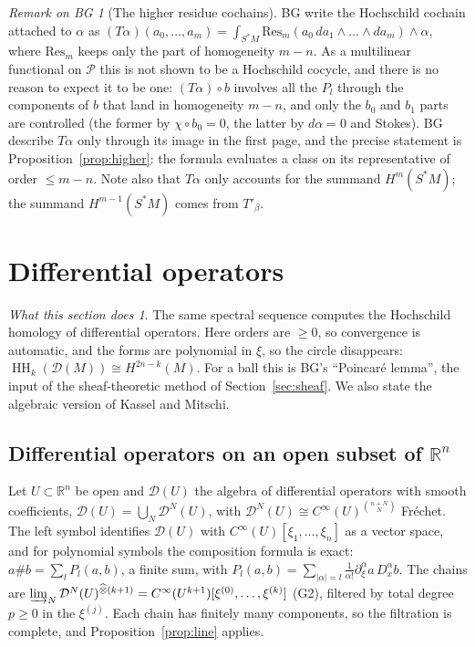 \documentclass[11pt,oneside,reqno]{article}
\DeclareMathOperator{\HH}{HH}
\newcommand{\R}{\mathbb R}
\newcommand{\cD}{\mathcal D}
\newcommand{\cP}{\mathcal P}
\newcommand{\CI}{C^\infty}
\newcommand{\hot}{\mathbin{\widehat\otimes}}
\newcommand{\pa}{\partial}
\theoremstyle{plain}
\theoremstyle{definition}
\theoremstyle{remark}
\newtheorem{bgremark}[theorem]{Remark on BG}
\newtheorem*{whatdoes}{What this section does}
\begin{document}
\begin{bgremark}[The higher residue cochains]\label{rem:higherres}
BG write the Hochschild cochain attached to \(\alpha\) as
\((T\alpha)(a_0,\dots,a_m)=\int_{S^*M}\mathrm{Res}_m(a_0\,da_1\wedge\dots\wedge da_m)\wedge\alpha\), where
\(\mathrm{Res}_m\) keeps only the part of homogeneity \(m-n\). As a multilinear functional on \(\cP\)
this is not shown to be a Hochschild cocycle, and there is no reason to expect it to
be one: \((T\alpha)\circ b\) involves all the \(P_l\) through the components of \(b\) that land in
homogeneity \(m-n\), and only the \(b_0\) and \(b_1\) parts are controlled (the former by \(\chi\circ b_0=0\), the latter by \(d\alpha=0\) and Stokes). BG
describe \(T\alpha\) only through its image in the first page, and the precise
statement is Proposition~\ref{prop:higher}: the formula evaluates a class on its
representative of order \(\le m-n\). Note also that \(T\alpha\) only accounts for the summand
\(H^m(S^*M)\); the summand \(H^{m-1}(S^*M)\) comes from \(T'_\beta\).
\end{bgremark}

\section{Differential operators}\label{sec:diffops}

\begin{whatdoes}
The same spectral sequence computes the Hochschild homology of differential
operators. Here orders are \(\ge0\), so convergence is automatic, and the forms are
polynomial in \(\xi\), so the circle disappears: \(\HH_k(\cD(M))\cong H^{2n-k}(M)\). For a ball this
is BG's ``Poincaré lemma'', the input of the sheaf-theoretic method of
Section~\ref{sec:sheaf}. We also state the algebraic version of Kassel and
Mitschi.
\end{whatdoes}

\subsection{Differential operators on an open subset of \texorpdfstring{\(\R^n\)}{Rn}}\label{subsec:DU}
Let \(U\subset\R^n\) be open and \(\cD(U)\) the algebra of differential operators with smooth
coefficients, \(\cD(U)=\bigcup_N\cD^N(U)\), with \(\cD^N(U)\cong\CI(U)^{\binom{n+N}N}\) Fréchet.
The left symbol identifies \(\cD(U)\) with \(\CI(U)[\xi_1,\dots,\xi_n]\) as a vector space,
and for polynomial symbols the composition formula is exact:
\(a\#b=\sum_lP_l(a,b)\), a finite sum, with \(P_l(a,b)=\sum_{|\alpha|=l}\frac1{\alpha!}\pa_\xi^\alpha a\,D_x^\alpha b\).
The chains are \(\varinjlim_N\cD^N(U)^{\hot(k+1)}=\CI(U^{k+1})[\xi^{(0)},\dots,\xi^{(k)}]\) (G2), filtered by
total degree \(p\ge0\) in the \(\xi^{(j)}\). Each chain has finitely many components, so the
filtration is complete, and Proposition~\ref{prop:line} applies.
\end{document}
